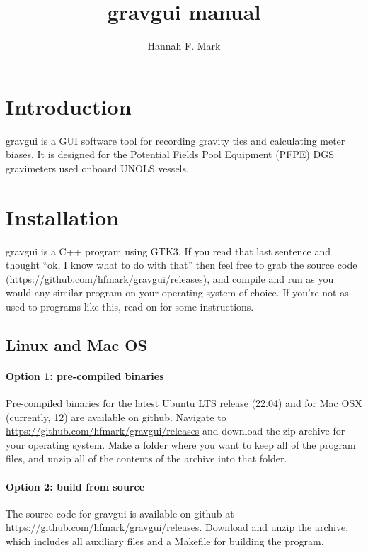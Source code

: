 \documentclass{pfpe-manual}
\title{gravgui manual}
\author{Hannah F. Mark}
\begin{document}
\maketitle

\tableofcontents
\newpage

\section{Introduction}

gravgui is a GUI software tool for recording gravity ties and calculating meter biases. It is designed for the Potential Fields Pool Equipment (PFPE) DGS gravimeters used onboard UNOLS vessels.

\section{Installation}
\label{install}
gravgui is a C++ program using GTK3. If you read that last sentence and thought ``ok, I know what to do with that'' then feel free to grab the source code (\url{https://github.com/hfmark/gravgui/releases}), and compile and run as you would any similar program on your operating system of choice. If you're not as used to programs like this, read on for some instructions.

\subsection{Linux and Mac OS}
\label{inst:unix}
\paragraph{Option 1: pre-compiled binaries}
Pre-compiled binaries for the latest Ubuntu LTS release (22.04) and for Mac OSX (currently, 12) are available on github. Navigate to \url{https://github.com/hfmark/gravgui/releases} and download the zip archive for your operating system. Make a folder where you want to keep all of the program files, and unzip all of the contents of the archive into that folder.

\paragraph{Option 2: build from source}
The source code for gravgui is available on github at \url{https://github.com/hfmark/gravgui/releases}. Download and unzip the archive, which includes all auxiliary files and a Makefile for building the program.
\end{document}
